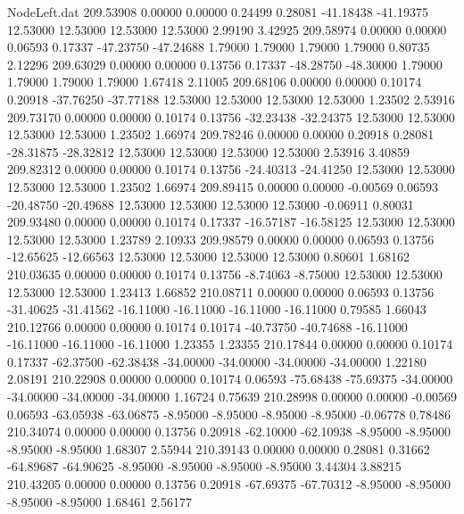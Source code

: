 \begin{filecontents}{NodeLeft.dat}
 209.53908    0.00000    0.00000     0.24499    0.28081  -41.18438  -41.19375   12.53000   12.53000   12.53000   12.53000    2.99190    3.42925
 209.58974    0.00000    0.00000     0.06593    0.17337  -47.23750  -47.24688    1.79000    1.79000    1.79000    1.79000    0.80735    2.12296
 209.63029    0.00000    0.00000     0.13756    0.17337  -48.28750  -48.30000    1.79000    1.79000    1.79000    1.79000    1.67418    2.11005
 209.68106    0.00000    0.00000     0.10174    0.20918  -37.76250  -37.77188   12.53000   12.53000   12.53000   12.53000    1.23502    2.53916
 209.73170    0.00000    0.00000     0.10174    0.13756  -32.23438  -32.24375   12.53000   12.53000   12.53000   12.53000    1.23502    1.66974
 209.78246    0.00000    0.00000     0.20918    0.28081  -28.31875  -28.32812   12.53000   12.53000   12.53000   12.53000    2.53916    3.40859
 209.82312    0.00000    0.00000     0.10174    0.13756  -24.40313  -24.41250   12.53000   12.53000   12.53000   12.53000    1.23502    1.66974
 209.89415    0.00000    0.00000    -0.00569    0.06593  -20.48750  -20.49688   12.53000   12.53000   12.53000   12.53000   -0.06911    0.80031
 209.93480    0.00000    0.00000     0.10174    0.17337  -16.57187  -16.58125   12.53000   12.53000   12.53000   12.53000    1.23789    2.10933
 209.98579    0.00000    0.00000     0.06593    0.13756  -12.65625  -12.66563   12.53000   12.53000   12.53000   12.53000    0.80601    1.68162
 210.03635    0.00000    0.00000     0.10174    0.13756   -8.74063   -8.75000   12.53000   12.53000   12.53000   12.53000    1.23413    1.66852
 210.08711    0.00000    0.00000     0.06593    0.13756  -31.40625  -31.41562  -16.11000  -16.11000  -16.11000  -16.11000    0.79585    1.66043
 210.12766    0.00000    0.00000     0.10174    0.10174  -40.73750  -40.74688  -16.11000  -16.11000  -16.11000  -16.11000    1.23355    1.23355
 210.17844    0.00000    0.00000     0.10174    0.17337  -62.37500  -62.38438  -34.00000  -34.00000  -34.00000  -34.00000    1.22180    2.08191
 210.22908    0.00000    0.00000     0.10174    0.06593  -75.68438  -75.69375  -34.00000  -34.00000  -34.00000  -34.00000    1.16724    0.75639
 210.28998    0.00000    0.00000    -0.00569    0.06593  -63.05938  -63.06875   -8.95000   -8.95000   -8.95000   -8.95000   -0.06778    0.78486
 210.34074    0.00000    0.00000     0.13756    0.20918  -62.10000  -62.10938   -8.95000   -8.95000   -8.95000   -8.95000    1.68307    2.55944
 210.39143    0.00000    0.00000     0.28081    0.31662  -64.89687  -64.90625   -8.95000   -8.95000   -8.95000   -8.95000    3.44304    3.88215
 210.43205    0.00000    0.00000     0.13756    0.20918  -67.69375  -67.70312   -8.95000   -8.95000   -8.95000   -8.95000    1.68461    2.56177

\end{filecontents}
